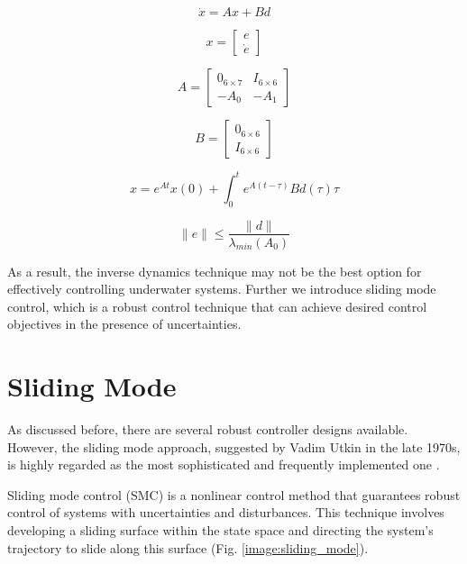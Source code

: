     \begin{equation}
        \dot x = Ax + Bd
    \end{equation}

    $$
    x = \begin{bmatrix} e \\ \dot e \end{bmatrix} 
    $$

    $$ A = \begin{bmatrix} 0_{6 \times 7} & I_{6 \times 6} \\ -A_0 & -A_1 \end{bmatrix}$$

    $$ B = \begin{bmatrix} 0_{6 \times 6} \\ I_{ 6 \times 6} \end{bmatrix}$$

    \begin{equation}
        x = e^{At}x(0) + \int_0^t e^{A(t - \tau)}Bd(\tau)\tau
    \end{equation}

    \begin{equation}
        \|e\| \leq \frac{\|d\|}{\lambda_{min}(A_0)}
    \end{equation}


    As a result, the inverse dynamics technique may not be the best option for effectively 
    controlling underwater systems. Further we introduce sliding mode control, which is a robust 
    control technique that can achieve desired control objectives in the presence of uncertainties.

\section{Sliding Mode}

    As discussed before, there are several robust controller
    designs available. However, the sliding mode approach, suggested by Vadim 
    Utkin in the late 1970s, is highly regarded as the most sophisticated and 
    frequently implemented one \cite{utkin}.

    Sliding mode control (SMC) is a nonlinear control method that guarantees
    robust control of systems with uncertainties and disturbances.
    This technique involves developing a sliding surface within the state
    space and directing the system's trajectory to slide along this surface (Fig. \ref{image:sliding_mode}).
    
